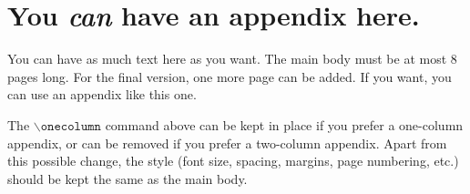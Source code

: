 \documentclass{article}
\theoremstyle{plain}
\theoremstyle{definition}
\theoremstyle{remark}
\begin{document}
\nocite{langley00}




\newpage
\appendix
\onecolumn
\section{You \emph{can} have an appendix here.}

You can have as much text here as you want. The main body must be at most $8$
pages long. For the final version, one more page can be added. If you want, you
can use an appendix like this one.

The $\mathtt{\backslash onecolumn}$ command above can be kept in place if you
prefer a one-column appendix, or can be removed if you prefer a two-column
appendix.  Apart from this possible change, the style (font size, spacing,
margins, page numbering, etc.) should be kept the same as the main body.
\end{document}
